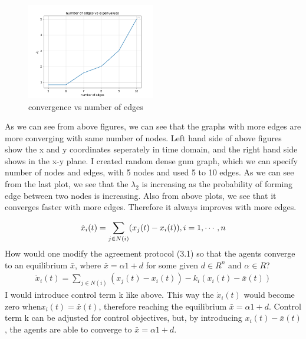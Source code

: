 \documentclass{article}
\begin{document}
\begin{problem}
\begin{figure}
    \end{figure}
    \begin{figure}
        \centering
        \includegraphics[width=0.5\textwidth]{./img/Figure_13.png}
        \caption{convergence vs number of edges}
    \end{figure}
    \newpage
    As we can see from above figures, we can see that the graphs with more edges are more converging with same number of nodes. Left hand side of above figures show the x and y coordinates seperately in time domain, and the right hand side shows in the x-y plane. I created random dense gnm graph, which we can specify number of nodes and edges, with 5 nodes and used  5 to 10 edges. As we can see from the last plot, we see that the $\lambda_2$ is increasing as the probability of forming edge between two nodes is increasing. Also from above plots, we see that it converges faster with more edges. Therefore it always improves with more edges.
\end{problem}
\begin{problem}
    \begin{align*}
        \dot{x}_i(t) = \sum_{j \in N(i)} (x_j(t) - x_i(t)), \space i = 1, \cdots , n
    \end{align*}
    How would one modify the agreement protocol (3.1) so that the agents converge to an equilibrium $\bar{x}$, where $\bar{x} = \alpha 1 + d$ for some given $d \in R^n$ and $\alpha \in R$?
    \begin{align*}
        \dot{x}_i(t) = \sum_{j \in N(i)} (x_j(t) - x_i(t)) - k_i(x_i(t) - \bar{x}(t))
    \end{align*}
    I would introduce control term k like above. This way the $\dot{x}_i(t)$ would become zero when$ x_i(t) = \bar{x}(t)$, therefore reaching the equilibrium $\bar{x} = \alpha 1 + d$.
    Control term k can be adjusted for control objectives, but, by introducing $x_i(t) - \bar{x}(t)$, the agents are able to converge to  $\bar{x} = \alpha 1 + d$.
\end{problem}
\end{document}
